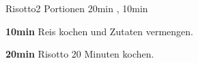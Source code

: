 \documentclass[../recipe-collections/cooking.tex]{subfiles}
\begin{document}
\begin{recipe}{Risotto}{2 Portionen }{20min , 10min }

  \freeform{}\textit{}


  \textbf{10min}
  Reis kochen und Zutaten vermengen.

  \newstep{}\textbf{20min}
  Risotto 20 Minuten kochen.

  \freeform{}\hrulefill{}

\end{recipe}
\end{document}
